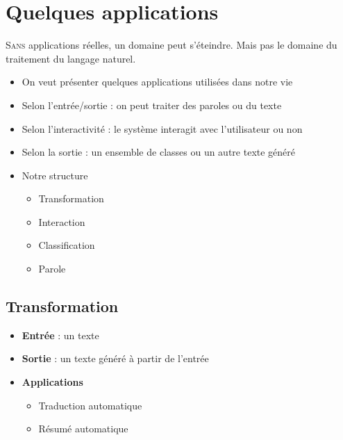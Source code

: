 \documentclass{KodeBook}
\begin{document}
		\mainmatter
	
\fi
\chapter{Quelques applications}

\begin{introduction}
	\lettrine{S}{ans} applications réelles, un domaine peut s'éteindre. 
	Mais pas le domaine du traitement du langage naturel.
\end{introduction} 

\begin{itemize}
	\item On veut présenter quelques applications utilisées dans notre vie
	\item Selon l'entrée/sortie : on peut traiter des paroles ou du texte
	\item Selon l'interactivité : le système interagit avec l'utilisateur ou non
	\item Selon la sortie : un ensemble de classes ou un autre texte généré
	\item Notre structure 
	\begin{itemize}
		\item Transformation
		\item Interaction
		\item Classification
		\item Parole
	\end{itemize}
\end{itemize}

\section{Transformation}

\begin{itemize}
	\item \textbf{Entrée} : un texte 
	\item \textbf{Sortie} : un texte généré à partir de l'entrée
	\item \textbf{Applications} 
	\begin{itemize}
		\item Traduction automatique
		\item Résumé automatique
	\end{itemize}
\end{itemize}
\end{document}
